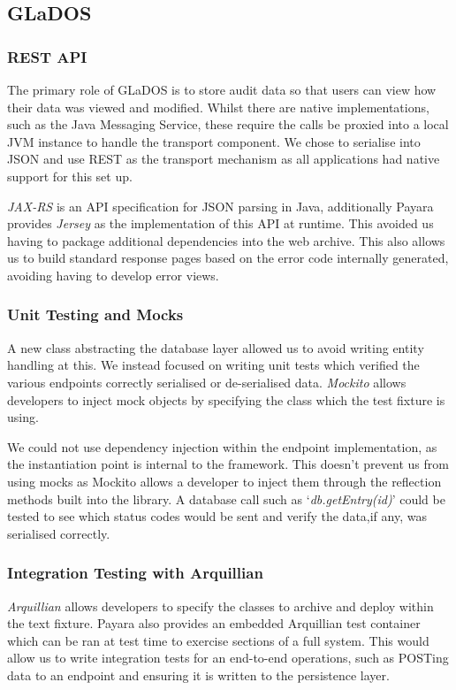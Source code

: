     \subsection{GLaDOS}
        \subsubsection{REST API}
        \par
        The primary role of GLaDOS is to store audit data so that users can view how their data was viewed and modified. Whilst there are native implementations, such as the Java Messaging Service, these require the calls be proxied into a local JVM instance to handle the transport component. We chose to serialise into JSON and use REST as the transport mechanism as all applications had native support for this set up.

        \par
        \textit{JAX-RS} is an API specification for JSON parsing in Java, additionally Payara provides \textit{Jersey} as the implementation of this API at runtime. This avoided us having to package additional dependencies into the web archive. This also allows us to build standard response pages based on the error code internally generated, avoiding having to develop error views.        

        \subsubsection{Unit Testing and Mocks}
        \par
        A new class abstracting the database layer allowed us to avoid writing entity handling at this. We instead focused on writing unit tests which verified the various endpoints correctly serialised or de-serialised data. \textit{Mockito}\cite{Mockito} allows developers to inject mock objects by specifying the class which the test fixture is using.

        \par
        We could not use dependency injection within the endpoint implementation, as the instantiation point is internal to the framework. This doesn't prevent us from using mocks as Mockito allows a developer to inject them through the reflection methods built into the library. A database call such as `\textit{db.getEntry(id)}' could be tested to see which status codes would be sent and verify the data,if any, was serialised correctly.

        \subsubsection{Integration Testing with Arquillian}
        \textit{Arquillian}\cite{Arquillian} allows developers to specify the classes to archive and deploy within the text fixture. Payara also provides an embedded Arquillian test container which can be ran at test time to exercise sections of a full system. This would allow us to write integration tests for an end-to-end operations, such as POSTing data to an endpoint and ensuring it is written to the persistence layer.

